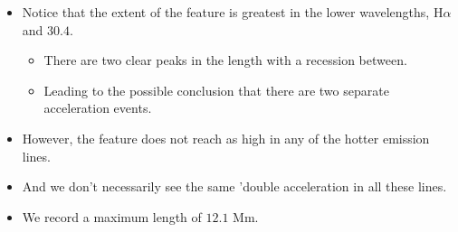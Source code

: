 \documentclass{beamer}
\begin{document}

	\begin{frame}
	\end{frame}


	\begin{frame}
		\begin{itemize}
			\item{Notice that the extent of the feature is greatest in the lower wavelengths, H$\alpha$ and $30.4$.}
			\begin{itemize}
				\item{There are two clear peaks in the length with a recession between.}
				\item{Leading to the possible conclusion that there are two separate acceleration events.}
			\end{itemize}
			\item{However, the feature does not reach as high in any of the hotter emission lines.}
			\item{And we don't necessarily see the same 'double acceleration in all these lines.}
			\item{We record a maximum length of $\mathbb{12.1}$ Mm.}
		\end{itemize}
	\end{frame}
\end{document}
